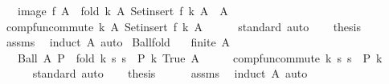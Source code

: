 \begin{isabellebody}
\ \ \ {\isachardoublequoteopen}image\ f\ A\ {\isacharequal}{\kern0pt}\ fold\ {\isacharparenleft}{\kern0pt}{\isasymlambda}k\ A{\isachardot}{\kern0pt}\ Set{\isachardot}{\kern0pt}insert\ {\isacharparenleft}{\kern0pt}f\ k{\isacharparenright}{\kern0pt}\ A{\isacharparenright}{\kern0pt}\ {\isacharbraceleft}{\kern0pt}{\isacharbraceright}{\kern0pt}\ A{\isachardoublequoteclose}\isanewline
%
\isadelimproof
%
\endisadelimproof
%
\isatagproof
{}\isamarkupfalse%
\ {\isacharminus}{\kern0pt}\isanewline
\ \ \isamarkupfalse%
\ comp{\isacharunderscore}{\kern0pt}fun{\isacharunderscore}{\kern0pt}commute\ {\isachardoublequoteopen}{\isasymlambda}k\ A{\isachardot}{\kern0pt}\ Set{\isachardot}{\kern0pt}insert\ {\isacharparenleft}{\kern0pt}f\ k{\isacharparenright}{\kern0pt}\ A{\isachardoublequoteclose}\isanewline
\ \ \ \ \isamarkupfalse%
\ standard\ auto\isanewline
\ \ \isamarkupfalse%
\ {\isacharquery}{\kern0pt}thesis\isanewline
\ \ \ \ \isamarkupfalse%
\ assms\ \isamarkupfalse%
\ {\isacharparenleft}{\kern0pt}induct\ A{\isacharparenright}{\kern0pt}\ auto\isanewline
{}\isamarkupfalse%
%
\endisatagproof
{\isafoldproof}%
%
\isadelimproof
\isanewline
%
\endisadelimproof
\isanewline
{}\isamarkupfalse%
\ Ball{\isacharunderscore}{\kern0pt}fold{\isacharcolon}{\kern0pt}\isanewline
\ \ \ {\isachardoublequoteopen}finite\ A{\isachardoublequoteclose}\isanewline
\ \ \ {\isachardoublequoteopen}Ball\ A\ P\ {\isacharequal}{\kern0pt}\ fold\ {\isacharparenleft}{\kern0pt}{\isasymlambda}k\ s{\isachardot}{\kern0pt}\ s\ {\isasymand}\ P\ k{\isacharparenright}{\kern0pt}\ True\ A{\isachardoublequoteclose}\isanewline
%
\isadelimproof
%
\endisadelimproof
%
\isatagproof
{}\isamarkupfalse%
\ {\isacharminus}{\kern0pt}\isanewline
\ \ \isamarkupfalse%
\ comp{\isacharunderscore}{\kern0pt}fun{\isacharunderscore}{\kern0pt}commute\ {\isachardoublequoteopen}{\isasymlambda}k\ s{\isachardot}{\kern0pt}\ s\ {\isasymand}\ P\ k{\isachardoublequoteclose}\isanewline
\ \ \ \ \isamarkupfalse%
\ standard\ auto\isanewline
\ \ \isamarkupfalse%
\ {\isacharquery}{\kern0pt}thesis\isanewline
\ \ \ \ \isamarkupfalse%
\ assms\ \isamarkupfalse%
\ {\isacharparenleft}{\kern0pt}induct\ A{\isacharparenright}{\kern0pt}\ auto\isanewline
{}\isamarkupfalse%
%
\endisatagproof
{\isafoldproof}%
%
\isadelimproof
\isanewline
%
\endisadelimproof
\isanewline

\end{isabellebody}
